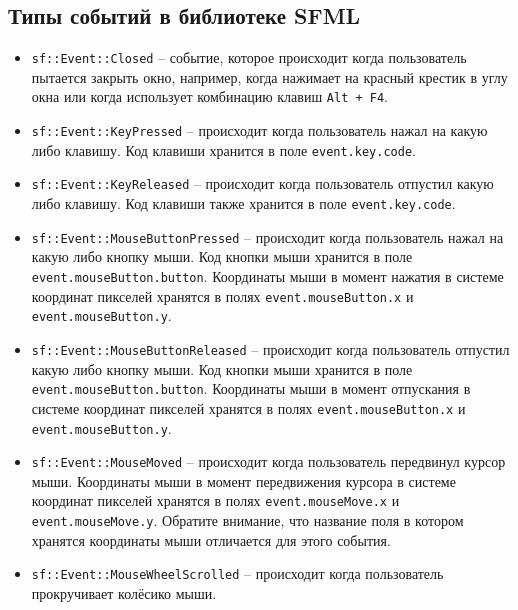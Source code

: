 \documentclass{article}
\begin{document}
\newpage
\subsection*{Типы событий в библиотеке SFML}
\begin{itemize}
\item \texttt{sf::Event::Closed} -- событие, которое происходит когда пользователь пытается закрыть окно, например, когда нажимает на красный крестик в углу окна или когда использует комбинацию клавиш \texttt{Alt + F4}.

\item \texttt{sf::Event::KeyPressed} -- происходит когда пользователь нажал на какую либо клавишу. Код клавиши хранится в поле \texttt{event.key.code}.

\item \texttt{sf::Event::KeyReleased} -- происходит когда пользователь отпустил какую либо клавишу. Код клавиши также хранится в поле \texttt{event.key.code}.

\item \texttt{sf::Event::MouseButtonPressed} -- происходит когда пользователь нажал на какую либо кнопку мыши. Код кнопки мыши хранится в поле \texttt{event.mouseButton.button}. Координаты мыши в момент нажатия в системе координат пикселей хранятся в полях \texttt{event.mouseButton.x} и \texttt{event.mouseButton.y}.

\item \texttt{sf::Event::MouseButtonReleased} -- происходит когда пользователь отпустил какую либо кнопку мыши. Код кнопки мыши хранится в поле \texttt{event.mouseButton.button}. Координаты мыши в момент отпускания в системе координат пикселей хранятся в полях \texttt{event.mouseButton.x} и \texttt{event.mouseButton.y}.

\item \texttt{sf::Event::MouseMoved} -- происходит когда пользователь передвинул курсор мыши. Координаты мыши в момент передвижения курсора в системе координат пикселей хранятся в полях \texttt{event.mouseMove.x} и \texttt{event.mouseMove.y}. Обратите внимание, что название поля в котором хранятся координаты мыши отличается для этого события.

\item \texttt{sf::Event::MouseWheelScrolled} -- происходит когда пользователь прокручивает колёсико мыши.
\end{itemize}
\end{document}
